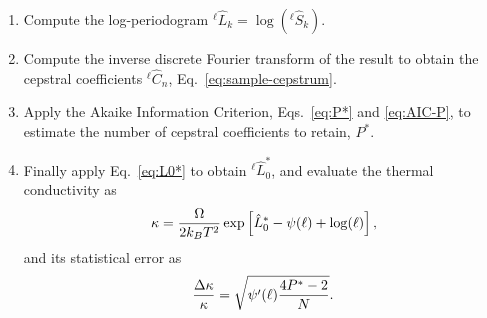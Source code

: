 \begin{enumerate}
    \item Compute the log-periodogram ${^{\ell\!}}\hat{L}_k = \log({^{\ell\!}}\hat{S}_k)$.
    \item Compute the inverse discrete Fourier transform of the result to obtain the cepstral coefficients ${^{\ell\!}}\hat{C}_n$, Eq.~\eqref{eq:sample-cepstrum}. 
    \item Apply the Akaike Information Criterion, Eqs.~\eqref{eq:P*} and \eqref{eq:AIC-P}, to estimate the number of cepstral coefficients to retain, $P^*$.
    \item Finally apply Eq.~\eqref{eq:L0*} to obtain ${^{\ell\!}}\hat{L}_0^*$, and evaluate the thermal conductivity as
    \begin{equation}
        \kappa = \frac{{\mathrm\Omega}}{2k_B T^2} \exp\left[\hat{L}_0^* - \psi(\ell) + \log(\ell) \right],
    \end{equation}
    and its statistical error as
    \begin{equation}
        \frac{{\mathrm\Delta}\kappa}{\kappa} = \sqrt{\psi'(\ell) \frac{4P^{*}-2}{N}}.
    \end{equation}
\end{enumerate}


